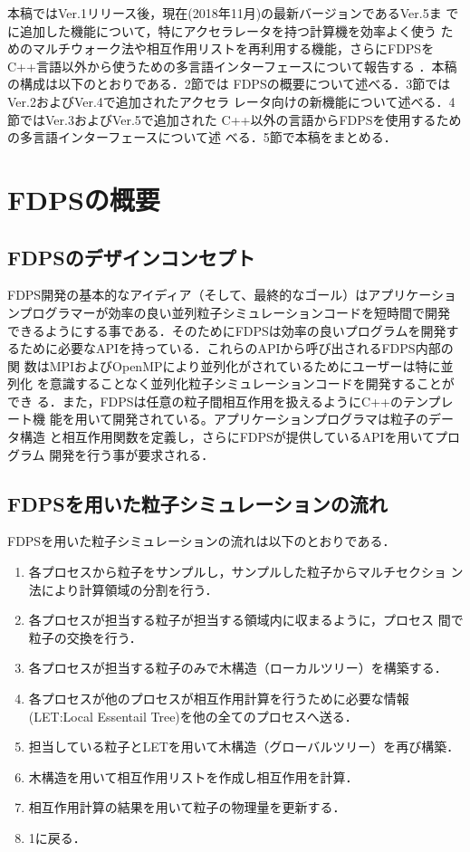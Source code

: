 \documentclass[submit]{ipsj}
\begin{document}
本稿ではVer.1リリース後，現在(2018年11月)の最新バージョンであるVer.5ま
でに追加した機能について，特にアクセラレータを持つ計算機を効率よく使う
ためのマルチウォーク法や相互作用リストを再利用する機能，さらにFDPSを
C++言語以外から使うための多言語インターフェースについて報告する
\cite{2018PASJ...70...70N}．本稿の構成は以下のとおりである．2節では
FDPSの概要について述べる．3節ではVer.2およびVer.4で追加されたアクセラ
レータ向けの新機能について述べる．4節ではVer.3およびVer.5で追加された
C++以外の言語からFDPSを使用するための多言語インターフェースについて述
べる．5節で本稿をまとめる．

\section{FDPSの概要}

\subsection{FDPSのデザインコンセプト}

FDPS開発の基本的なアイディア（そして、最終的なゴール）はアプリケーショ
ンプログラマーが効率の良い並列粒子シミュレーションコードを短時間で開発
できるようにする事である．そのためにFDPSは効率の良いプログラムを開発す
るために必要なAPIを持っている．これらのAPIから呼び出されるFDPS内部の関
数はMPIおよびOpenMPにより並列化がされているためにユーザーは特に並列化
を意識することなく並列化粒子シミュレーションコードを開発することができ
る．また，FDPSは任意の粒子間相互作用を扱えるようにC++のテンプレート機
能を用いて開発されている。アプリケーションプログラマは粒子のデータ構造
と相互作用関数を定義し，さらにFDPSが提供しているAPIを用いてプログラム
開発を行う事が要求される．

\subsection{FDPSを用いた粒子シミュレーションの流れ}

FDPSを用いた粒子シミュレーションの流れは以下のとおりである．
\begin{enumerate}
\item 各プロセスから粒子をサンプルし，サンプルした粒子からマルチセクショ
  ン法\cite{2004PASJ...56..521M}により計算領域の分割を行う．
\item 各プロセスが担当する粒子が担当する領域内に収まるように，プロセス
  間で粒子の交換を行う．
\item 各プロセスが担当する粒子のみで木構造（ローカルツリー）を構築する．
\item 各プロセスが他のプロセスが相互作用計算を行うために必要な情報
  (LET:Local Essentail Tree)を他の全てのプロセスへ送る．
\item 担当している粒子とLETを用いて木構造（グローバルツリー）を再び構築．
\item 木構造を用いて相互作用リストを作成し相互作用を計算．
\item 相互作用計算の結果を用いて粒子の物理量を更新する．
\item 1に戻る．
\end{enumerate}
\end{document}
